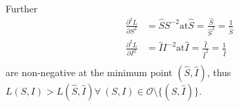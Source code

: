 Further
\begin{align}
    \frac{\partial^2 L}{\partial S^2} &= \hat{S}S^{-2} \textrm{at} \hat{S} = \frac{\hat{S}}{\hat{S}^2} = \frac{1}{\hat{S}}\nonumber\\
    \frac{\partial^2 L}{\partial I^2} &= \hat{I}I^{-2} \textrm{at} \hat{I} = \frac{\hat{I}}{\hat{I}^2} = \frac{1}{\hat{I}}\nonumber\\
\end{align}
are non-negative at the minimum point $(\hat{S},\hat{I})$, thus $L(S,I) > L(\hat{S},\hat{I}) \forall\ (S,I) \in {\mathcal O} \setminus \{(\hat{S},\hat{I})\}$.
